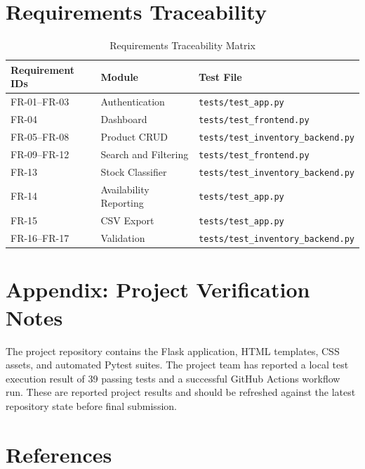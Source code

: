 \documentclass[conference]{IEEEtran}
\begin{document}
\section{Requirements Traceability}

\begin{table}[!t]
\caption{Requirements Traceability Matrix}
\label{tab:rtm}
\centering
\small
\begin{tabularx}{\textwidth}{l l l}
\toprule
\textbf{Requirement IDs} & \textbf{Module} & \textbf{Test File}\\
\midrule
FR-01--FR-03 & Authentication & \texttt{tests/test\_app.py}\\
FR-04 & Dashboard & \texttt{tests/test\_frontend.py}\\
FR-05--FR-08 & Product CRUD & \texttt{tests/test\_inventory\_backend.py}\\
FR-09--FR-12 & Search and Filtering & \texttt{tests/test\_frontend.py}\\
FR-13 & Stock Classifier & \texttt{tests/test\_inventory\_backend.py}\\
FR-14 & Availability Reporting & \texttt{tests/test\_app.py}\\
FR-15 & CSV Export & \texttt{tests/test\_app.py}\\
FR-16--FR-17 & Validation & \texttt{tests/test\_inventory\_backend.py}\\
\bottomrule
\end{tabularx}
\end{table}

\section{Appendix: Project Verification Notes}

The project repository contains the Flask application, HTML templates, CSS assets, and automated Pytest suites. The project team has reported a local test execution result of 39 passing tests and a successful GitHub Actions workflow run. These are reported project results and should be refreshed against the latest repository state before final submission.

\section{References}
\end{document}
